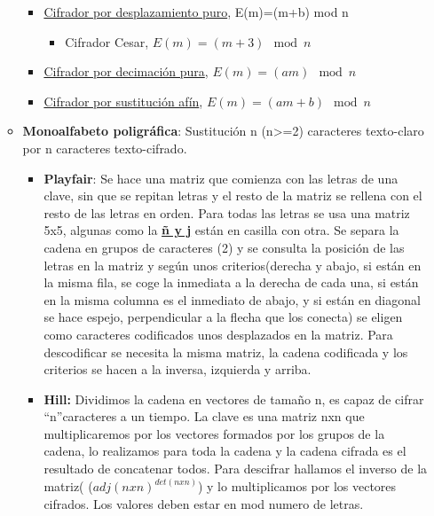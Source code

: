 \documentclass[12pt, twoside, openright]{report} %
\begin{document}
\begin{itemize}
\begin{itemize}
      \begin{itemize}
      \item \underline{Cifrador por desplazamiento puro}, E(m)=(m+b) mod n
        

        \begin{itemize}
        \item Cifrador Cesar, $E(m)=(m+3) \mod n$
          
        \end{itemize}
      \item \underline{Cifrador por decimación pura}, $E(m)=(am) \mod n$
        
      \item \underline{Cifrador por sustitución afín}, $E(m)=(am+b) \mod n$
        
      \end{itemize}
    \item \textbf{Monoalfabeto poligráfica}: Sustitución n (n\textgreater=2)
      caracteres texto-claro por n caracteres texto-cifrado.
      

      \begin{itemize}
      \item \textbf{Playfair}: Se hace una matriz que comienza con las
        letras de una clave, sin que se repitan letras y el resto de la
        matriz se rellena con el resto de las letras en orden. Para
        todas las letras se usa una matriz 5x5, algunas como la
        \textbf{\underline{ñ y j}} están en casilla con otra. Se separa
        la cadena en grupos de caracteres (2) y se consulta la posición
        de las letras en la matriz y según unos criterios(derecha y
        abajo, si están en la misma fila, se coge la inmediata a la
        derecha de cada una, si están en la misma columna es el
        inmediato de abajo, y si están en diagonal se hace espejo,
        perpendicular a la flecha que los conecta) se eligen como
        caracteres codificados unos desplazados en la matriz. Para
        descodificar se necesita la misma matriz, la cadena codificada y
        los criterios se hacen a la inversa, izquierda y arriba.
        
      \item \textbf{Hill:} Dividimos la cadena en vectores de tamaño n, es
        capaz de cifrar ``n''caracteres a un tiempo. La clave es una
        matriz nxn que multiplicaremos por los vectores formados por los
        grupos de la cadena, lo realizamos para toda la cadena y la
        cadena cifrada es el resultado de concatenar todos. Para
        descifrar hallamos el inverso de la matriz(
        ($adj(nxn)^{det(nxn)}$) y lo multiplicamos por los vectores
        cifrados. Los valores deben estar en mod numero de letras.
        

\end{itemize}
\end{itemize}
\end{itemize}
\end{document}
